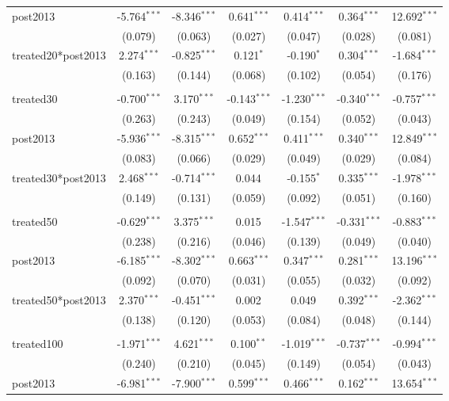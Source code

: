 \documentclass[12pt]{article}
\begin{document}
\begin{table}[!htbp]
\begin{tabular}{@{\extracolsep{5pt}}lcccccc}
 post2013 & -5.764$^{***}$ & -8.346$^{***}$ & 0.641$^{***}$ & 0.414$^{***}$ & 0.364$^{***}$ & 12.692$^{***}$ \\
  & (0.079) & (0.063) & (0.027) & (0.047) & (0.028) & (0.081) \\
 treated20*post2013 & 2.274$^{***}$ & -0.825$^{***}$ & 0.121$^{*}$ & -0.190$^{*}$ & 0.304$^{***}$ & -1.684$^{***}$ \\
  & (0.163) & (0.144) & (0.068) & (0.102) & (0.054) & (0.176) \\
\hline \\[-1.8ex]
 treated30 & -0.700$^{***}$ & 3.170$^{***}$ & -0.143$^{***}$ & -1.230$^{***}$ & -0.340$^{***}$ & -0.757$^{***}$ \\
  & (0.263) & (0.243) & (0.049) & (0.154) & (0.052) & (0.043) \\
 post2013 & -5.936$^{***}$ & -8.315$^{***}$ & 0.652$^{***}$ & 0.411$^{***}$ & 0.340$^{***}$ & 12.849$^{***}$ \\
  & (0.083) & (0.066) & (0.029) & (0.049) & (0.029) & (0.084) \\
 treated30*post2013 & 2.468$^{***}$ & -0.714$^{***}$ & 0.044$^{}$ & -0.155$^{*}$ & 0.335$^{***}$ & -1.978$^{***}$ \\
  & (0.149) & (0.131) & (0.059) & (0.092) & (0.051) & (0.160) \\
\hline \\[-1.8ex]
 treated50 & -0.629$^{***}$ & 3.375$^{***}$ & 0.015$^{}$ & -1.547$^{***}$ & -0.331$^{***}$ & -0.883$^{***}$ \\
  & (0.238) & (0.216) & (0.046) & (0.139) & (0.049) & (0.040) \\
 post2013 & -6.185$^{***}$ & -8.302$^{***}$ & 0.663$^{***}$ & 0.347$^{***}$ & 0.281$^{***}$ & 13.196$^{***}$ \\
  & (0.092) & (0.070) & (0.031) & (0.055) & (0.032) & (0.092) \\
 treated50*post2013 & 2.370$^{***}$ & -0.451$^{***}$ & 0.002$^{}$ & 0.049$^{}$ & 0.392$^{***}$ & -2.362$^{***}$ \\
  & (0.138) & (0.120) & (0.053) & (0.084) & (0.048) & (0.144) \\
\hline \\[-1.8ex]
 treated100 & -1.971$^{***}$ & 4.621$^{***}$ & 0.100$^{**}$ & -1.019$^{***}$ & -0.737$^{***}$ & -0.994$^{***}$ \\
  & (0.240) & (0.210) & (0.045) & (0.149) & (0.054) & (0.043) \\
 post2013 & -6.981$^{***}$ & -7.900$^{***}$ & 0.599$^{***}$ & 0.466$^{***}$ & 0.162$^{***}$ & 13.654$^{***}$ \\

\end{tabular}
\end{table}
\end{document}
